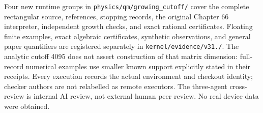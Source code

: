 \documentclass[
  11pt,
  oneside]{book}
\begin{document}
Four new runtime groups in \texttt{physics/\allowbreak qm/\allowbreak growing\_\allowbreak cutoff/\allowbreak } cover
the complete rectangular source, references, stopping records, the
original Chapter 66 interpreter, independent growth checks, and exact
rational certificates. Floating finite examples, exact algebraic
certificates, synthetic observations, and general paper quantifiers are
registered separately in \texttt{kernel/\allowbreak evidence/\allowbreak v31./\allowbreak }. The analytic
cutoff 4095 does not assert construction of that matrix dimension:
full-record numerical examples use smaller known support explicitly
stated in their receipts. Every execution records the actual environment
and checkout identity; checker authors are not relabelled as remote
executors. The three-agent cross-review is internal AI review, not
external human peer review. No real device data were obtained.

\backmatter
\end{document}
